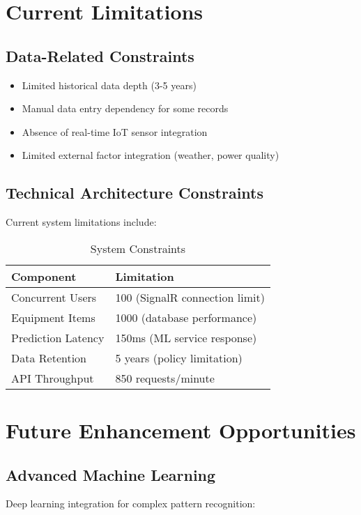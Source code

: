 \documentclass[12pt,a4paper]{report}
\begin{document}
\section{Current Limitations}

\subsection{Data-Related Constraints}
\begin{itemize}
    \item Limited historical data depth (3-5 years)
    \item Manual data entry dependency for some records
    \item Absence of real-time IoT sensor integration
    \item Limited external factor integration (weather, power quality)
\end{itemize}

\subsection{Technical Architecture Constraints}
Current system limitations include:

\begin{table}[H]
\centering
\caption{System Constraints}
\begin{tabular}{|l|l|}
\hline
\textbf{Component} & \textbf{Limitation} \\
\hline
Concurrent Users & 100 (SignalR connection limit) \\
Equipment Items & 1000 (database performance) \\
Prediction Latency & 150ms (ML service response) \\
Data Retention & 5 years (policy limitation) \\
API Throughput & 850 requests/minute \\
\hline
\end{tabular}
\end{table}

\section{Future Enhancement Opportunities}

\subsection{Advanced Machine Learning}

Deep learning integration for complex pattern recognition:
\end{document}
